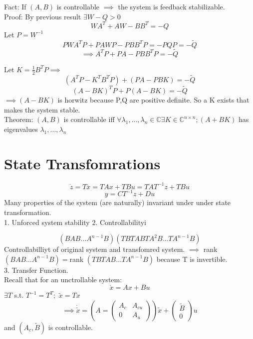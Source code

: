 \documentclass{article}
\begin{document}
Fact: If $(A,B)$ is controllable $\implies$ the system is feedback stabilizable.\\
Proof: By previous result $\exists W-Q>0$\\
\[WA^T+AW-BB^T=-Q\]
Let $P=W^{-1}$\\
\[PWA^TP+PAWP-PBB^TP=-PQP=-\tilde{Q}\]
\[\implies A^TP+PA-PBB^TP=-\tilde{Q}\]

Let $K=\frac{1}{2}B^TP\implies$\\
\[(A^TP-K^TB^TP)+(PA-PBK)=-\tilde{Q}\]
\[(A-BK)^TP+P(A-BK)=-\tilde{Q}\]
$\implies (A-BK)$ is horwitz because P,Q are positive definite. So a K exists that makes the system stable.\\

Theorem: $(A,B)$ is controllable iff $\forall \lambda_1,\dots,\lambda_n\in\mathbb{C} \exists K\in \mathbb{C}^{n\times n}; (A+BK)$ has eigenvalues $\lambda_1,\dots,\lambda_n$\\


\section{State Transfomrations}
\[\dot{z}=T\dot{x}=TAx+TBu=TAT^{-1}z+TBu\]
\[y=CT^{-1}z+Du\]
Many properties of the system (are naturally) invariant under under state transformation.\\

1. Unforced system stability
2. Controllabilityi

\[(B AB \dots A^{n-1}B) (TB TAB TA^2B \dots TA^{n-1}B)\]
Controllabilliyt of original system and transfomred system.
$\implies$ rank$(B AB\dots A^{n-1}B)=$rank $(TB TAB \dots TA^{n-1}B)$ because T is invertible.\\

3. Transfer Function.\\

Recall that for an unctrollable system:
\[\dot{x}=Ax+Bu\]
$\exists T$ s.t. $T^{-1}=T^T;$ $\tilde{x}=Tx$\\
\[\implies \dot{\tilde{x}}=(A=\begin{pmatrix}A_c & A_{cu}\\0 & A_u\end{pmatrix})\tilde{x}+\begin{pmatrix}\tilde{B}\\0\end{pmatrix}u\]
and $(A_c,\tilde{B})$ is controllable.\\
\end{document}
